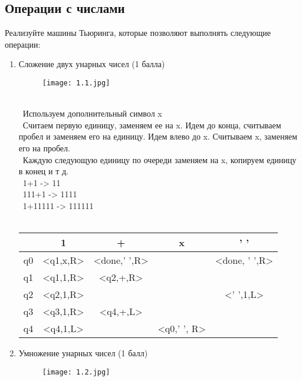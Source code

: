 \documentclass[a4paper]{article}
\begin{document}
\subsection{Операции с числами}

Реализуйте машины Тьюринга, которые позволяют выполнять следующие операции:
\begin{enumerate}
    \item Сложение двух унарных чисел (1 балла)
    \begin{figure}[h]
        \centering
        \texttt{[image: 1.1.jpg]}
    \end{figure}
\\
\ Используем дополнительный символ x \\
\ Считаем первую единицу, заменяем ее  на x. Идем до конца, считываем пробел и заменяем его на единицу. Идем влево до x. Считываем x, заменяем его на пробел. \\
\ Каждую следующую единицу по очереди заменяем на x, копируем единицу в конец и т д. \\
\ 1+1 -> 11\\
\ 111+1 -> 1111\\
\ 1+11111 -> 111111\\
\\
\begin{tabular}{|*{5}{c|}}
\textbf{ } & 1 & + & x & ' '\\
\hline\hline
q0 & <q1,x,R> & <done,' ',R> & & <done, ' ',R> \\
\hline\hline
q1 & <q1,1,R> & <q2,+,R> & & \\
\hline\hline
q2 & <q2,1,R> & & & <' ',1,L> \\
\hline\hline
q3 & <q3,1,R> & <q4,+,L> & & \\
\hline\hline
q4 & <q4,1,L> & &<q0,' ', R> & \\
\hline\hline
\end{tabular}
    \item Умножение унарных чисел (1 балл)
        \begin{figure}[h]
        \centering
        \texttt{[image: 1.2.jpg]}
    \end{figure}
    

\end{enumerate}
\end{document}

